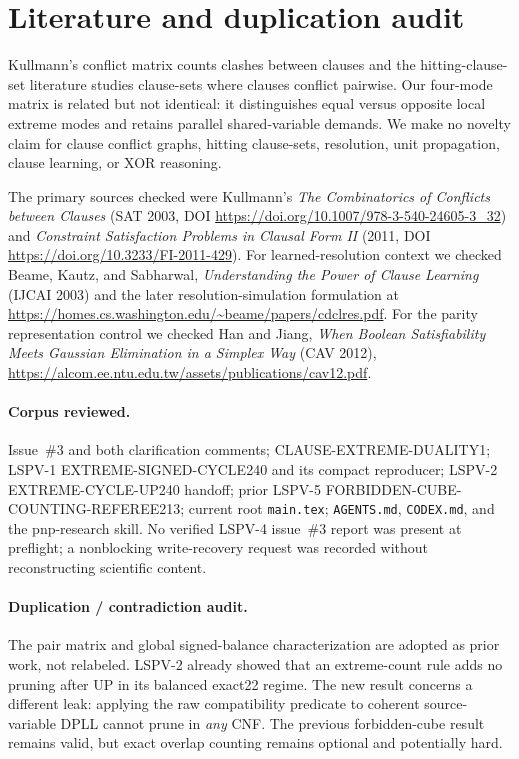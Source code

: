 \documentclass[10pt]{article}
\begin{document}
\section{Literature and duplication audit}

Kullmann's conflict matrix counts clashes between clauses and the hitting-clause-set
literature studies clause-sets where clauses conflict pairwise.  Our four-mode matrix
is related but not identical: it distinguishes equal versus opposite local extreme
modes and retains parallel shared-variable demands.  We make no novelty claim for
clause conflict graphs, hitting clause-sets, resolution, unit propagation, clause
learning, or XOR reasoning.

The primary sources checked were Kullmann's \emph{The Combinatorics of Conflicts
between Clauses} (SAT 2003, DOI \url{https://doi.org/10.1007/978-3-540-24605-3_32})
and \emph{Constraint Satisfaction Problems in Clausal Form II} (2011, DOI
\url{https://doi.org/10.3233/FI-2011-429}).  For learned-resolution context we checked
Beame, Kautz, and Sabharwal, \emph{Understanding the Power of Clause Learning}
(IJCAI 2003) and the later resolution-simulation formulation at
\url{https://homes.cs.washington.edu/~beame/papers/cdclres.pdf}.  For the parity
representation control we checked Han and Jiang, \emph{When Boolean Satisfiability
Meets Gaussian Elimination in a Simplex Way} (CAV 2012),
\url{https://alcom.ee.ntu.edu.tw/assets/publications/cav12.pdf}.

\paragraph{Corpus reviewed.}
Issue~\#3 and both clarification comments; CLAUSE-EXTREME-DUALITY1; LSPV-1
EXTREME-SIGNED-CYCLE240 and its compact reproducer; LSPV-2 EXTREME-CYCLE-UP240
handoff; prior LSPV-5 FORBIDDEN-CUBE-COUNTING-REFEREE213; current root
\texttt{main.tex}; \texttt{AGENTS.md}, \texttt{CODEX.md}, and the pnp-research
skill.  No verified LSPV-4 issue~\#3 report was present at preflight; a nonblocking
write-recovery request was recorded without reconstructing scientific content.

\paragraph{Duplication / contradiction audit.}
The pair matrix and global signed-balance characterization are adopted as prior work,
not relabeled.  LSPV-2 already showed that an extreme-count rule adds no pruning after
UP in its balanced exact22 regime.  The new result concerns a different leak: applying
the raw compatibility predicate to coherent source-variable DPLL cannot prune in
\emph{any} CNF.  The previous forbidden-cube result remains valid, but exact overlap
counting remains optional and potentially hard.
\end{document}
